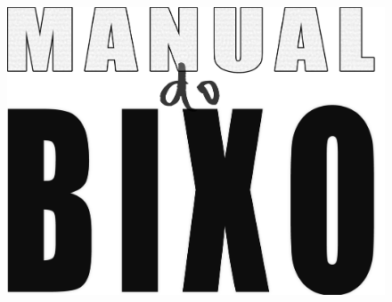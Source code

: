 \documentclass[a4paper,10pt,oldfontcommands]{memoir}
\begin{document}
\pagestyle{empty}
\frontmatter
\begin{figure}[H]
    \centering
    \includegraphics[width=.85\textwidth]{img/manual_logo.png}
\end{figure}
\end{document}
